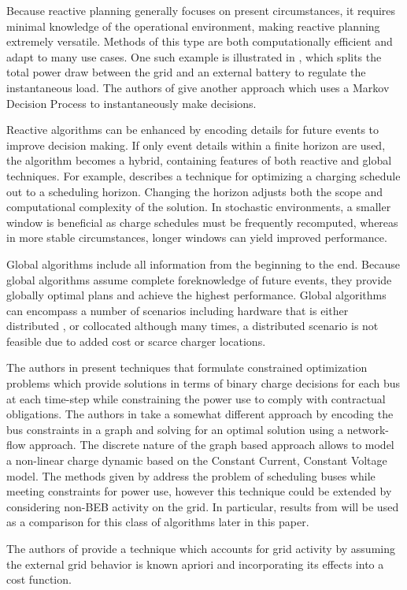 \par Because reactive planning generally focuses on present circumstances, it requires minimal knowledge of the operational environment, making reactive planning extremely versatile.  Methods of this type are both computationally efficient and adapt to many use cases.  One such example is illustrated in \cite{cheng_smart_2020}, which splits the total power draw between the grid and an external battery to regulate the instantaneous load. The authors of \cite{Wang2019} give another approach which uses a Markov Decision Process to instantaneously make decisions.
\par Reactive algorithms can be enhanced by encoding details for future events to improve decision making. If only event details within a finite horizon are used, the algorithm becomes a hybrid, containing features of both reactive and global techniques. For example, \cite{bagherinezhad_spatio-temporal_2020} describes a technique for optimizing a charging schedule out to a scheduling horizon. Changing the horizon adjusts both the scope and computational complexity of the solution. In stochastic environments, a smaller window is beneficial as charge schedules must be frequently recomputed, whereas in more stable circumstances, longer windows can yield improved performance. 
\par Global algorithms include all information from the beginning to the end. Because global algorithms assume complete foreknowledge of future events, they provide globally optimal plans and achieve the highest performance. Global algorithms can encompass a number of scenarios including hardware that is either distributed \cite{Nimalsiri2020}, or collocated although many times, a distributed scenario is not feasible due to added cost or scarce charger locations.
\par The authors in \cite{el-taweel_incorporation_2019, Leou_optimal_2017, Wei2018, Rinalde_Mixed_2020, He_2019_Fast} present techniques that formulate constrained optimization problems which provide solutions in terms of binary charge decisions for each bus at each time-step while constraining the power use to comply with contractual obligations. The authors in \cite{whitaker_network_2021} take a somewhat different approach by encoding the bus constraints in a graph and solving for an optimal solution using a network-flow approach. The discrete nature of the graph based approach allows \cite{whitaker_network_2021} to model a non-linear charge dynamic based on the Constant Current, Constant Voltage model. The methods given by \cite{el-taweel_incorporation_2019, Leou_optimal_2017, whitaker_network_2021, He_2022_Battery} address the problem of scheduling buses while meeting constraints for power use, however this technique could be extended by considering non-BEB activity on the grid. In particular, results from \cite{He_2022_Battery} will be used as a comparison for this class of algorithms later in this paper.
\par The authors of \cite{jahic_preemptive_2019} provide a technique which accounts for grid activity by assuming the external grid behavior is known apriori and incorporating its effects into a cost function.
